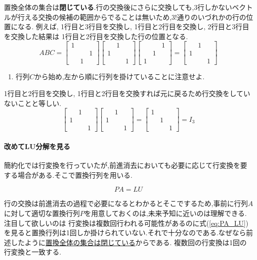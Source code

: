置換全体の集合は\textbf{閉じている}.行の交換後にさらに交換しても,3行しかないベクトルが行える交換の候補の範囲からでることは無いため,$3!$通りのいづれかの行の位置になる.
例えば,
1行目と3行目を交換し,
1行目と2行目を交換し,
2行目と3行目を交換した結果は
1行目と2行目を交換した行の位置となる.
\[ABC=
\begin{bmatrix}
    1&& \\ &&1 \\ &1&
\end{bmatrix}
\begin{bmatrix}
    &1& \\ 1&& \\ &&1
\end{bmatrix}
\begin{bmatrix}
    &&1 \\ &1& \\ 1&&
\end{bmatrix}
=
\begin{bmatrix}
    &1& \\ 1&& \\  &&1
\end{bmatrix}
\]
\begin{enumerate}[label=※]
    \item 行列$C$から始め,左から順に行列を掛けていることに注意せよ.
\end{enumerate}
1行目と2行目を交換し,
1行目と2行目を交換すれば元に戻るため行交換をしていないことと等しい.
\begin{equation}
    \begin{bmatrix}
        &1& \\ 1&& \\ &&1
    \end{bmatrix}
    \begin{bmatrix}
        &1& \\ 1&& \\ &&1
    \end{bmatrix}
    = \begin{bmatrix}
        1&& \\ &1& \\ &&1
    \end{bmatrix}=I_3
\end{equation}
\paragraph{改めてLU分解を見る}
簡約化では行変換を行っていたが,前進消去においても必要に応じて行変換を要する場合がある.そこで置換行列を用いる.
\begin{tcolorbox}[colframe=black!75,colback=white,title=行変換を含むLU分解]
\vspace{-5mm}
\begin{equation}
    PA = LU \label{eq:PA_LU}
\end{equation}
\end{tcolorbox}
行の交換は前進消去の過程で必要になるとわかるとそこでするため,事前に行列$A$に対して適切な置換行列$P$を用意しておくのは,未来予知に近いのは理解できる.注目して欲しいのは
行変換は複数回行われる可能性があるのに式(\ref{eq:PA_LU})を見ると置換行列は1回しか掛けられていない.それで十分なのである.なぜなら前述したように\underline{置換全体の集合は閉じている}からである.
複数回の行変換は1回の行変換と一致する.
